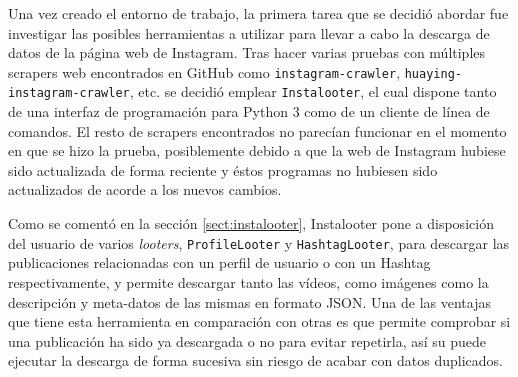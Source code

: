 Una vez creado el entorno de trabajo, la primera tarea que se decidió abordar fue investigar las posibles herramientas a utilizar para llevar a cabo la descarga de datos de la página web de Instagram. Tras hacer varias pruebas con múltiples scrapers web encontrados en GitHub como \texttt{instagram-crawler}, \texttt{huaying-instagram-crawler}, etc. se decidió emplear \texttt{Instalooter}, el cual dispone tanto de una interfaz de programación para Python 3 como de un cliente de línea de comandos. El resto de scrapers encontrados no parecían funcionar en el momento en que se hizo la prueba, posiblemente debido a que la web de Instagram hubiese sido actualizada de forma reciente y éstos programas no hubiesen sido actualizados de acorde a los nuevos cambios.

Como se comentó en la sección \ref{sect:instalooter}, Instalooter pone a disposición del usuario de varios \textit{looters}, \texttt{ProfileLooter} y \texttt{HashtagLooter}, para descargar las publicaciones relacionadas con un perfil de usuario o con un Hashtag respectivamente, y permite descargar tanto las vídeos, como imágenes como la descripción y meta-datos de las mismas en formato JSON. Una de las ventajas que tiene esta herramienta en comparación con otras es que permite comprobar si una publicación ha sido ya descargada o no para evitar repetirla, así su puede ejecutar la descarga de forma sucesiva sin riesgo de acabar con datos duplicados.

